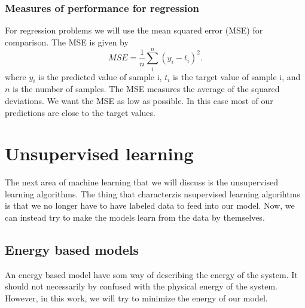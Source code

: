 \subsubsection{Measures of performance for regression}
For regression problems we will use the mean squared error (MSE) for comparison. The MSE is given by
\begin{equation}
    MSE = \frac{1}{n}\sum_i^{n}(y_i - t_i)^2. 
\end{equation}
where $y_i$ is the predicted value of sample i, $t_i$ is the target value of sample i, and $n$ is the number of samples. 
The MSE measures the average of the squared deviations. We want the MSE as low as possible. In this case most of our predictions are close to the target values. 

\section{Unsupervised learning}
The next area of machine learning that we will discuss is the unsupervised learning algorithms. The thing that characterzis nsupervised learning algorihtms is that we no longer have to have labeled data to feed into our model. Now, we can instead try to make the models learn from the data by themselves. 

\subsection{Energy based models}
An energy based model have som way of describing the energy of the system. It should not necessarily by confused with the physical energy of the system. However, in this work, we will try to minimize the energy of our model. 

